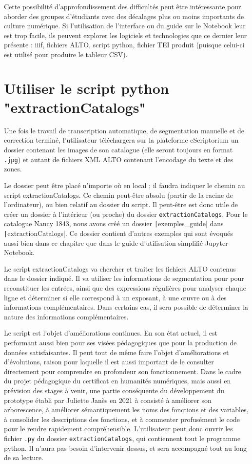 \documentclass[a4paper,12pt,twoside]{book}
\begin{document}
Cette possibilité d'approfondissement des difficultés peut être intéressante pour aborder des groupes d'étudiants avec des décalages plus ou moins importants de culture numérique. Si l'utilisation de l'interface ou du guide sur le Notebook leur est trop facile, ils peuvent explorer les logiciels et technologies que ce dernier leur présente : iiif, fichiers ALTO, script python, fichier TEI produit (puisque celui-ci est utilisé pour produire le tableur CSV). 




\chapter{Utiliser le script python "extractionCatalogs"}

Une fois le travail de transcription automatique, de segmentation manuelle et de correction terminé, l'utilisateur téléchargera sur la plateforme eScriptorium un dossier contenant les images de son catalogue (elle seront toujours en format \texttt{.jpg}) et autant de fichiers XML ALTO contenant l'encodage du texte et des zones.

Le dossier peut être placé n'importe où en local ; il faudra indiquer le chemin au script extractionCatalogs. Ce chemin peut-être absolu (partir de la racine de l'ordinateur), ou bien relatif au dossier du script. Il peut-être est donc utile de créer un dossier à l'intérieur (ou proche) du dossier \texttt{extractionCatalogs}. Pour le catalogue Nancy 1843, nous avons créé un dossier \texttt|exemples_guide| dans \texttt|extractionCatalogs|. Ce dossier contient d'autres exemples qui sont évoqués aussi bien dans ce chapitre que dans le guide d'utilisation simplifié Jupyter Notebook. 

Le script extractionCatalogs va chercher et traiter les fichiers ALTO contenus dans le dossier indiqué. Il va utiliser les informations de segmentation pour pour reconstituer les entrées, ainsi que des expressions régulières pour analyser chaque ligne et déterminer si elle correspond à un exposant, à une œuvre ou à des informations complémentaires. Dans certains cas, il sera possible de déterminer la nature des informations complémentaires.

Le script est l'objet d'améliorations continues. En son état actuel, il est performant aussi bien pour ses visées pédagogiques que pour la production de données satisfaisantes. Il peut tout de même faire l'objet d'améliorations et d'évolutions, raison pour laquelle il est aussi important de le consulter directement pour comprendre en profondeur son fonctionnement. Dans le cadre du projet pédagogique du certificat en humanités numériques, mais aussi en prévision des stages à venir, une partie conséquente du développement du prototype établi par Juliette Janès en 2021 à consisté à améliorer son arborescence, à améliorer sémantiquement les noms des fonctions et des variables, à consolider les descriptions des fonctions, et à commenter profusément le code pour le rendre rapidement compréhensible. L'utilisateur peut donc ouvrir les fichier \texttt{.py} du dossier \texttt{extractionCatalogs}, qui contiennent tout le programme python. Il n'aura pas besoin d'intervenir dessus, et sera accompagné tout au long de sa lecture.
\end{document}

